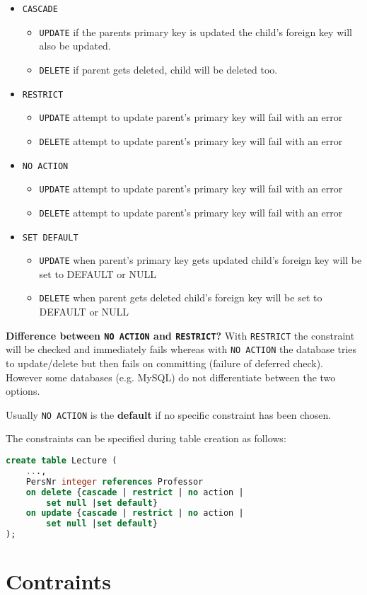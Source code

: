 \documentclass{sciposter}
\renewcommand{\t}[1]{\texttt{#1}}
\begin{document}
\begin{multicols}{3}
\begin{itemize}
	\item \t{CASCADE}
	\begin{itemize} 
		\item \t{UPDATE} if the parents primary key is updated the child's foreign key will also be updated.
		\item \t{DELETE} if parent gets deleted, child will be deleted too.
	\end{itemize}
	\item \t{RESTRICT}
	\begin{itemize} 
		\item \t{UPDATE} attempt to update parent's primary key will fail with an error
		\item \t{DELETE} attempt to update parent's primary key will fail with an error
	\end{itemize}
	\item \t{NO ACTION}
	\begin{itemize} 
		\item \t{UPDATE} attempt to update parent's primary key will fail with an error
		\item \t{DELETE} attempt to update parent's primary key will fail with an error
	\end{itemize}
	\item \t{SET DEFAULT}
	\begin{itemize} 
		\item \t{UPDATE} when parent's primary key gets updated child's foreign key will be set to DEFAULT or NULL
		\item \t{DELETE} when parent gets deleted child's foreign key will be set to DEFAULT or NULL
	\end{itemize}
\end{itemize}

\textbf{Difference between \t{NO ACTION} and \t{RESTRICT}?} With \t{RESTRICT} the constraint will be checked and immediately fails whereas with \t{NO ACTION} the database tries to update/delete but then fails on committing (failure of deferred check). However some databases (e.g. MySQL) do not differentiate between the two options.

Usually \t{NO ACTION} is the \textbf{default} if no specific constraint has been chosen.

The constraints can be specified during table creation as follows:

\begin{lstlisting}[language=SQL]
create table Lecture (
	...,
	PersNr integer references Professor
	on delete {cascade | restrict | no action |
		set null |set default}
	on update {cascade | restrict | no action |
		set null |set default}
); 
\end{lstlisting}


\section*{Contraints}

\newpage


\end{multicols}
\end{document}
